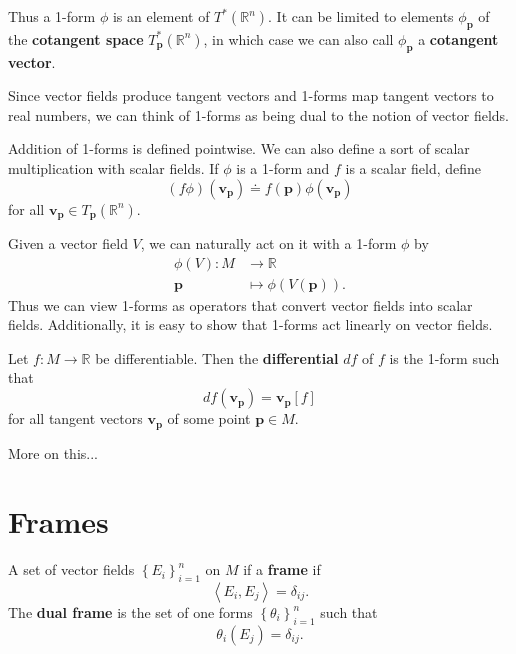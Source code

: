 \documentclass[10pt]{report}
\begin{document}
Thus a 1-form $\phi$ is an element of $T^*(\mathbb{R}^n)$. It can be limited to elements $\phi_\mathbf{p}$ of the \textbf{cotangent space} $T_{\mathbf{p}}^*(\mathbb{R}^n)$, in which case we can also call $\phi_\mathbf{p}$ a \textbf{cotangent vector}.

\begin{note}
Since vector fields produce tangent vectors and 1-forms map tangent vectors to real numbers, we can think of 1-forms as being dual to the notion of vector fields.
\end{note}

Addition of 1-forms is defined pointwise. We can also define a sort of scalar multiplication with scalar fields. If $\phi$ is a 1-form and $f$ is a scalar field, define
\[
	(f\phi)(\mathbf{v}_{\mathbf{p}}) \doteq f(\mathbf{p}) \phi(\mathbf{v}_\mathbf{p})
\] for all $\mathbf{v}_{\mathbf{p}} \in T_\mathbf{p}(\mathbb{R}^n)$.

Given a vector field $V$, we can naturally act on it with a 1-form $\phi$ by
\begin{align*}
	\phi(V):M&\to \mathbb{R} \\
	\mathbf{p}&\mapsto \phi(V(\mathbf{p})).
\end{align*}
Thus we can view 1-forms as operators that convert vector fields into scalar fields. Additionally, it is easy to show that 1-forms act linearly on vector fields.

\begin{defn}
Let $f:M\to \mathbb{R}$ be differentiable. Then the \textbf{differential} $df$ of $f$ is the 1-form such that
\[
	df(\mathbf{v}_{\mathbf{p}}) = \mathbf{v}_{\mathbf{p}}[f]
\] for all tangent vectors $\mathbf{v}_{\mathbf{p}}$ of some point $\mathbf{p} \in M$.
\end{defn}

{\color{red}More on this...}



\section{Frames}

\begin{defn}[]
A set of vector fields $\left\{ E_i \right\}_{i=1}^n$ on $M$ if a \textbf{frame} if
\[
\left\langle E_i, E_j \right\rangle = \delta_{ij}.
\] The \textbf{dual frame} is the set of one forms $\left\{ \theta_i \right\}_{i=1}^n$ such that
\[
	\theta_i(E_j) = \delta_{ij}.
\]
\end{defn}
\end{document}
